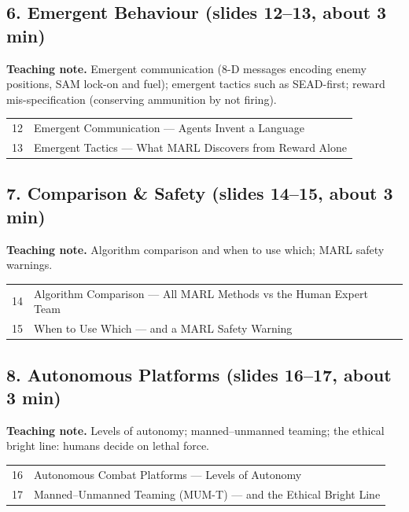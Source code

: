 \documentclass[11pt]{article}
\begin{document}
\subsection{6. Emergent Behaviour \normalfont\small\color{GreyN}(slides 12--13, about 3 min)}

\textbf{Teaching note.} Emergent communication (8-D messages encoding enemy positions, SAM lock-on and fuel); emergent tactics such as SEAD-first; reward mis-specification (conserving ammunition by not firing).

\begin{center}\small\renewcommand{\arraystretch}{1.1}\begin{tabularx}{\textwidth}{@{}r X@{}}12 & Emergent Communication --- Agents Invent a Language\\
13 & Emergent Tactics --- What MARL Discovers from Reward Alone\\\end{tabularx}\end{center}

\subsection{7. Comparison \& Safety \normalfont\small\color{GreyN}(slides 14--15, about 3 min)}

\textbf{Teaching note.} Algorithm comparison and when to use which; MARL safety warnings.

\begin{center}\small\renewcommand{\arraystretch}{1.1}\begin{tabularx}{\textwidth}{@{}r X@{}}14 & Algorithm Comparison --- All MARL Methods vs the Human Expert Team\\
15 & When to Use Which --- and a MARL Safety Warning\\\end{tabularx}\end{center}

\subsection{8. Autonomous Platforms \normalfont\small\color{GreyN}(slides 16--17, about 3 min)}

\textbf{Teaching note.} Levels of autonomy; manned--unmanned teaming; the ethical bright line: humans decide on lethal force.

\begin{center}\small\renewcommand{\arraystretch}{1.1}\begin{tabularx}{\textwidth}{@{}r X@{}}16 & Autonomous Combat Platforms --- Levels of Autonomy\\
17 & Manned--Unmanned Teaming (MUM-T) --- and the Ethical Bright Line\\\end{tabularx}\end{center}
\end{document}
